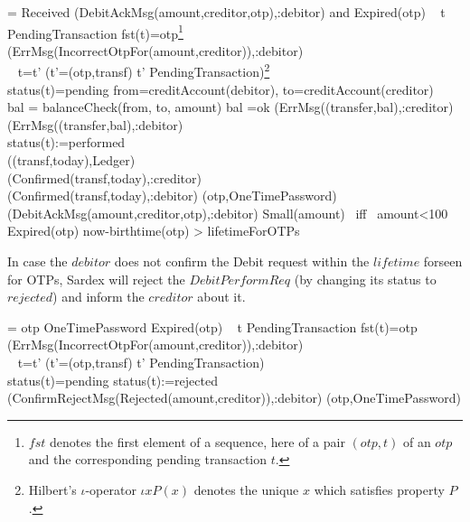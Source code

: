 \begin{asm}  
  =\+           
\IF Received
     (DebitAckMsg(amount,creditor,otp),\FROM :debitor) and \NOT Expired(otp) \THEN \+ 
  \IF ~ \THEREISNO t \in PendingTransaction \WITH fst(t)=otp\footnote{$fst$ denotes the first element of a sequence, here of a pair $(otp,t)$ of an $otp$ and the corresponding pending transaction $t$.} \+
     \THEN  ~ (ErrMsg(IncorrectOtpFor(amount,creditor)),\TO :debitor) \\
  \ELSE ~\+
     \LET t=\iota t' (t'=(otp,transf) \mid t'  \in PendingTransaction)\footnote{Hilbert's $\iota$-operator $\iota x P(x)$ denotes the unique $x$ which satisfies property  $P$.}\\
     \IF status(t)=pending \THEN \+
        \LET from=creditAccount(debitor), to=creditAccount(creditor)\\
        \LET bal = balanceCheck(from, to, amount) \+
          \IF bal \not =ok \THEN \+
             (ErrMsg((transfer,bal),\TO :creditor)\\
             (ErrMsg((transfer,bal),\TO :debitor) \\
              \ELSE \+
                status(t):=performed \\
                ((transf,today),Ledger) \\
                (Confirmed(transf,today),\TO :creditor)\\
                (Confirmed(transf,today),\TO :debitor)\dec\dec\-
                 (otp,OneTimePassword)\dec\dec\-  
  (DebitAckMsg(amount,creditor,otp),\FROM :debitor) \dec\-
\WHERE \+
Small(amount) \mbox{ iff } amount<100\\
Expired(otp) \IFF now-birthtime(otp) > lifetimeForOTPs
\end{asm}

In case the $debitor$ does not confirm the Debit request 
within the $lifetime$ forseen for OTPs,
Sardex will reject the $DebitPerformReq$ (by changing its status to $rejected$) and inform the $creditor$ about it.

\begin{asm}  
  =\+           
\IF otp \in OneTimePassword \AND Expired(otp)  \THEN \+ 
\IF ~ \THEREISNO t \in PendingTransaction \WITH fst(t)=otp\+
     \THEN  ~ (ErrMsg(IncorrectOtpFor(amount,creditor)),\TO :debitor) \\
  \ELSE ~\+
     \LET t=\iota t' (t'=(otp,transf) \mid t'  \in PendingTransaction)\\
     \IF status(t)=pending \THEN \+
          status(t):=rejected\\
          (ConfirmRejectMsg(Rejected(amount,creditor)),\TO :debitor)
                          \dec\dec\-
     (otp,OneTimePassword)     
\end{asm}




